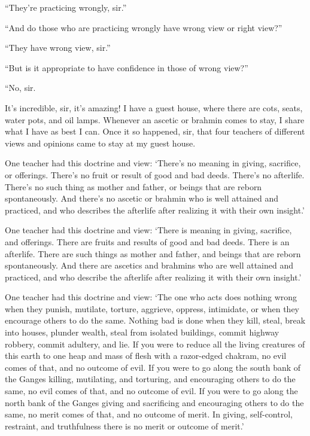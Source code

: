 \documentclass[12pt,openany]{book}%
\begin{document}
“They’re practicing wrongly, sir.” 

“And do those who are practicing wrongly have wrong view or right view?” 

“They have wrong view, sir.” 

“But is it appropriate to have confidence in those of wrong view?” 

“No, sir. 

It’s incredible, sir, it’s amazing! I have a guest house, where there are cots, seats, water pots, and oil lamps. Whenever an ascetic or brahmin comes to stay, I share what I have as best I can. Once it so happened, sir, that four teachers of different views and opinions came to stay at my guest house. 

One teacher had this doctrine and view: ‘There’s no meaning in giving, sacrifice, or offerings. There’s no fruit or result of good and bad deeds. There’s no afterlife. There’s no such thing as mother and father, or beings that are reborn spontaneously. And there’s no ascetic or brahmin who is well attained and practiced, and who describes the afterlife after realizing it with their own insight.’ 

One teacher had this doctrine and view: ‘There is meaning in giving, sacrifice, and offerings. There are fruits and results of good and bad deeds. There is an afterlife. There are such things as mother and father, and beings that are reborn spontaneously. And there are ascetics and brahmins who are well attained and practiced, and who describe the afterlife after realizing it with their own insight.’ 

One teacher had this doctrine and view: ‘The one who acts does nothing wrong when they punish, mutilate, torture, aggrieve, oppress, intimidate, or when they encourage others to do the same. Nothing bad is done when they kill, steal, break into houses, plunder wealth, steal from isolated buildings, commit highway robbery, commit adultery, and lie. If you were to reduce all the living creatures of this earth to one heap and mass of flesh with a razor-edged chakram, no evil comes of that, and no outcome of evil. If you were to go along the south bank of the Ganges killing, mutilating, and torturing, and encouraging others to do the same, no evil comes of that, and no outcome of evil. If you were to go along the north bank of the Ganges giving and sacrificing and encouraging others to do the same, no merit comes of that, and no outcome of merit. In giving, self-control, restraint, and truthfulness there is no merit or outcome of merit.’ 
\end{document}
